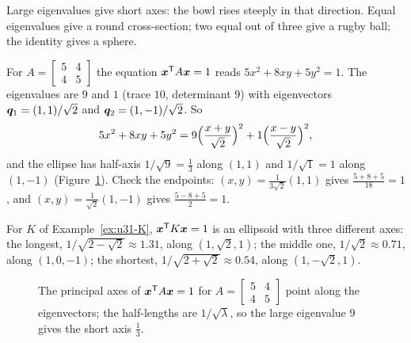 Large eigenvalues give short axes: the bowl rises steeply in that direction. Equal eigenvalues
give a round cross-section; two equal out of three give a rugby ball; the identity gives a
sphere.

\begin{example}\label{ex:u31-ellipse}
For $A=\begin{bmatrix}5&4\\4&5\end{bmatrix}$ the equation $\boldsymbol{x}^{\mathsf{T}} A\boldsymbol{x}=1$ reads $5x^2+8xy+5y^2=1$.
The eigenvalues are $9$ and $1$ (trace $10$, determinant $9$) with eigenvectors
$\boldsymbol{q}_1=(1,1)/\sqrt2$ and $\boldsymbol{q}_2=(1,-1)/\sqrt2$. So
\[
  5x^2+8xy+5y^2=9\Bigl(\frac{x+y}{\sqrt2}\Bigr)^2+1\Bigl(\frac{x-y}{\sqrt2}\Bigr)^2 ,
\]
and the ellipse has half-axis $1/\sqrt9=\tfrac13$ along $(1,1)$ and $1/\sqrt1=1$ along $(1,-1)$
(Figure~\ref{fig:u31-axes}). Check the endpoints: $(x,y)=\tfrac{1}{3\sqrt2}(1,1)$ gives
$\tfrac{5+8+5}{18}=1$, and $(x,y)=\tfrac{1}{\sqrt2}(1,-1)$ gives $\tfrac{5-8+5}{2}=1$.

For $K$ of Example~\ref{ex:u31-K}, $\boldsymbol{x}^{\mathsf{T}} K\boldsymbol{x}=1$ is an ellipsoid with three different axes:
the longest, $1/\sqrt{2-\sqrt2}\approx1.31$, along $(1,\sqrt2,1)$; the middle one, $1/\sqrt2\approx0.71$,
along $(1,0,-1)$; the shortest, $1/\sqrt{2+\sqrt2}\approx0.54$, along $(1,-\sqrt2,1)$.
\end{example}

\begin{figure}[ht]\centering
{}
\caption{The principal axes of $\boldsymbol{x}^{\mathsf{T}} A\boldsymbol{x}=1$ for $A=\left[\begin{smallmatrix}5&4\\4&5\end{smallmatrix}\right]$
point along the eigenvectors; the half-lengths are $1/\sqrt{\lambda}$, so the large eigenvalue $9$
gives the short axis $\tfrac13$.}
\label{fig:u31-axes}
\end{figure}

